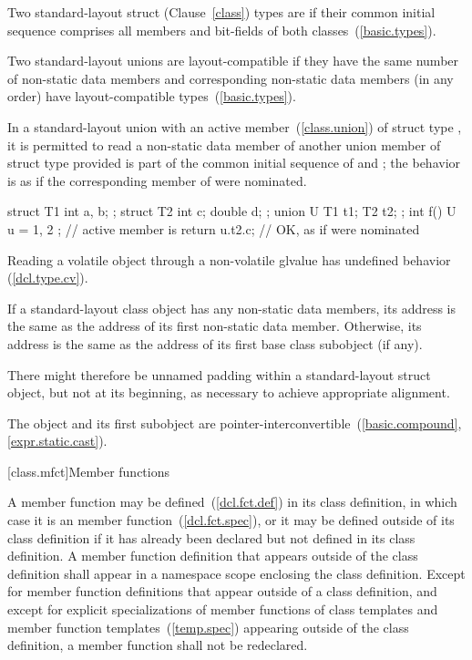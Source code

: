 \pnum
Two standard-layout struct (Clause~\ref{class}) types are
 if
their common initial sequence comprises all members and bit-fields of
both classes~(\ref{basic.types}).

\pnum
Two standard-layout unions are layout-compatible if they
have the same number of non-static data members and corresponding
non-static data members (in any order) have layout-compatible
types~(\ref{basic.types}).

\pnum
In a standard-layout union with an active member~(\ref{class.union})
of struct type , it is permitted to read a non-static
data member  of another union member of struct type 
provided  is part of the common initial sequence of  and ;
the behavior is as if the corresponding member of  were nominated.
\begin{example}
\begin{codeblock}
struct T1 { int a, b; };
struct T2 { int c; double d; };
union U { T1 t1; T2 t2; };
int f() {
  U u = { { 1, 2 } }; // active member is 
  return u.t2.c;      // OK, as if  were nominated
}
\end{codeblock}
\end{example}
\begin{note}
Reading a volatile object through a non-volatile glvalue has
undefined behavior (\ref{dcl.type.cv}).
\end{note}

\pnum
If a standard-layout class object has any non-static data members, its address
is the same as the address of its first non-static data member. Otherwise, its
address is the same as the address of its first base class subobject (if any).
\begin{note}
There might therefore be unnamed padding within a standard-layout struct object, but
not at its beginning, as necessary to achieve appropriate alignment.
\end{note}
\begin{note}
The object and its first subobject are
pointer-interconvertible~(\ref{basic.compound}, \ref{expr.static.cast}).
\end{note}

[class.mfct]{Member functions}%

\pnum
{}%
%
A member function may be defined~(\ref{dcl.fct.def}) in its class
definition, in which case it is an  member
function~(\ref{dcl.fct.spec}), or it may be defined outside of its class
definition if it has already been declared but not defined in its class
definition. A member function definition that appears outside of the
class definition shall appear in a namespace scope enclosing the class
definition. Except for member function definitions that appear outside
of a class definition, and except for explicit specializations of member
functions of class templates and member function
templates~(\ref{temp.spec}) appearing outside of the class definition, a
member function shall not be redeclared.

